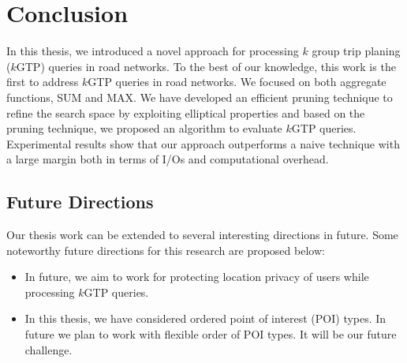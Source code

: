\chapter{Conclusion}
\label{chp:conclusion}
In this thesis, we introduced a novel approach for processing $k$ group trip planing ($k$GTP) queries in road networks. To the best
of our knowledge, this work is the first to address $k$GTP queries in road networks. We focused on both aggregate functions, SUM
and MAX. We have developed an efficient pruning technique to refine the search space by exploiting elliptical properties and based
on the pruning technique, we proposed an algorithm to evaluate $k$GTP queries. Experimental results show that our approach outperforms a naive technique with a large margin both in terms of I/Os and computational overhead. 


\section{Future Directions}
Our thesis work can be extended to several interesting directions in future. Some noteworthy future directions for this research are proposed below:

\begin{itemize}
    \item In future, we aim to work for protecting location privacy of users while processing $k$GTP queries.
    \item In this thesis, we have considered ordered point of interest (POI) types. In future we plan to work with flexible order of POI types. It will be our future challenge.


\end{itemize}


\endinput
